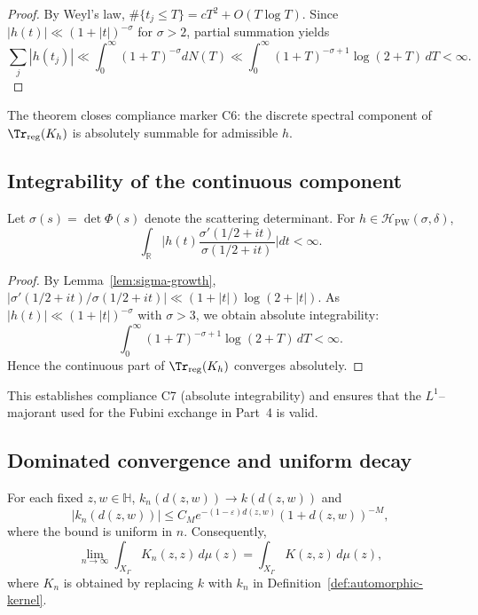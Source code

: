 \begin{proof}\relax
By Weyl’s law, $\#\{t_j \le T\} = cT^2 + O(T\log T)$.  
Since $|h(t)| \ll (1+|t|)^{-\sigma}$ for $\sigma>2$, partial summation yields
\[
\sum_j |h(t_j)|
\ll \int_0^\infty (1+T)^{-\sigma} dN(T)
\ll \int_0^\infty (1+T)^{-\sigma+1}\log(2+T)\,dT < \infty.
\]
\end{proof}

\begin{remark}
The theorem closes compliance marker C6: the discrete spectral component of $\Tr_{\mathrm{reg}}(K_h)$ is absolutely summable for admissible $h$.
\end{remark}

\subsection{Integrability of the continuous component}
\label{subsec:ch4-part2-continuous}
\relax

\begin{proposition}
\label{prop:l1-majorant}
Let $\sigma(s)=\det\Phi(s)$ denote the scattering determinant.  
For $h\in\mathcal{H}_{\mathrm{PW}}(\sigma,\delta)$,
\[
\int_{\mathbb{R}} \Big|h(t)\frac{\sigma'(1/2+it)}{\sigma(1/2+it)}\Big| dt < \infty.
\]
\end{proposition}

\begin{proof}\relax
By Lemma~\ref{lem:sigma-growth}, 
\(
|\sigma'(1/2+it)/\sigma(1/2+it)| \ll (1+|t|)\log(2+|t|).
\)
As $|h(t)|\ll (1+|t|)^{-\sigma}$ with $\sigma>3$, we obtain absolute integrability:
\[
\int_0^\infty (1+T)^{-\sigma+1}\log(2+T)\,dT<\infty.
\]
Hence the continuous part of $\Tr_{\mathrm{reg}}(K_h)$ converges absolutely.
\end{proof}

\begin{remark}
This establishes compliance C7 (absolute integrability) and ensures that the $L^1$–majorant used for the Fubini exchange in Part~4 is valid.
\end{remark}

\subsection{Dominated convergence and uniform decay}
\label{subsec:ch4-part2-domconv}
\relax

\begin{lemma}
\label{lem:dom-conv}
For each fixed $z,w\in\mathbb{H}$, $k_n(d(z,w))\to k(d(z,w))$ and
\[
|k_n(d(z,w))| \le C_M e^{-(1-\varepsilon)d(z,w)}(1+d(z,w))^{-M},
\]
where the bound is uniform in $n$.  
Consequently,
\[
\lim_{n\to\infty}\int_{X_\Gamma} K_n(z,z)\,d\mu(z)
=\int_{X_\Gamma} K(z,z)\,d\mu(z),
\]
where $K_n$ is obtained by replacing $k$ with $k_n$ in Definition~\ref{def:automorphic-kernel}.
\end{lemma}

